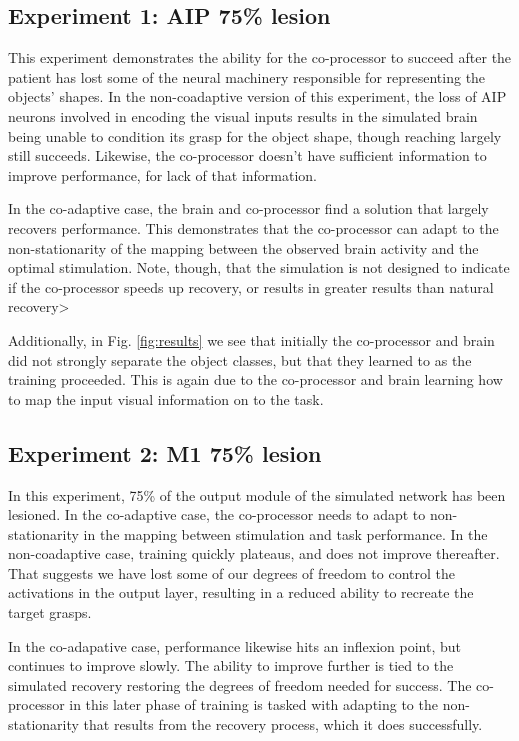 \documentclass[12pt]{iopart}
\begin{document}
\subsection{Experiment 1: AIP 75\% lesion}
This experiment demonstrates the ability for the co-processor to succeed after the
patient has lost some of the neural machinery responsible for representing the objects' shapes.
In the non-coadaptive version of this experiment, the loss of AIP neurons involved
in encoding the visual inputs results in the simulated brain being unable to
condition its grasp for the object shape, though reaching largely still succeeds.
Likewise, the co-processor doesn't have sufficient information to improve performance,
for lack of that information.

In the co-adaptive case, the brain and co-processor find a solution that largely recovers
performance. This demonstrates that the co-processor can adapt to the non-stationarity
of the mapping between the observed brain activity and the optimal stimulation. Note,
though, that the simulation is not designed to indicate if the co-processor speeds up
recovery, or results in greater results than natural recovery>

Additionally, in Fig. \ref{fig:results} we see that initially the co-processor and
brain did not strongly separate the object classes, but that they learned to as the
training proceeded. This is again due to the co-processor and brain learning how
to map the input visual information on to the task.

\subsection{Experiment 2: M1 75\% lesion}
In this experiment, 75\% of the output module of the simulated network has been
lesioned. In the co-adaptive case, the co-processor needs to adapt to
non-stationarity in the mapping between stimulation and task performance.
In the non-coadaptive case, training quickly plateaus, and does not improve
thereafter. That suggests we have lost some of our degrees of freedom to control
the activations in the output layer, resulting in a reduced ability to recreate
the target grasps.

In the co-adapative case, performance likewise hits an inflexion point, but
continues to improve slowly. The ability to improve further is tied to the
simulated recovery restoring the degrees of freedom needed for success. The
co-processor in this later phase of training is tasked with adapting to the
non-stationarity that results from the recovery process, which it does
successfully.
\end{document}
